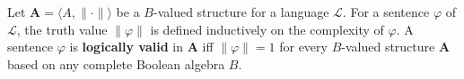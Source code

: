 Let $\mathbf{A} = \langle A, \|\cdot\| \rangle$ be a $B$-valued structure for a language $\mathcal{L}$. For a sentence $\varphi$ of $\mathcal{L}$, the truth value $\|\varphi\|$ is defined inductively on the complexity of $\varphi$. A sentence $\varphi$ is \textbf{logically valid} in $\mathbf{A}$ iff $\|\varphi\| = 1$ for every $B$-valued structure $\mathbf{A}$ based on any complete Boolean algebra $B$.
